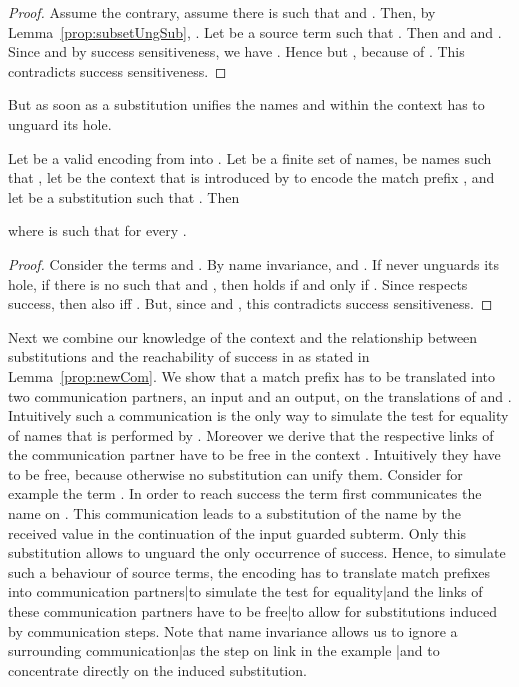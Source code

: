 \documentclass[]{article}
\begin{document}
\begin{proof}
	Assume the contrary, \ie assume there is  such that  and . Then, by Lemma~\ref{prop:subsetUngSub}, . Let  be a source term such that . Then  and  and . Since  and by success sensitiveness, we have . Hence  but , because of . This contradicts success sensitiveness.
\end{proof}

But as soon as a substitution unifies the names  and  within  the context has to unguard its hole.

\begin{lemma}
	\label{lem:subContextUnguardsHole}
	Let \encod be a valid encoding from \piT into \piNM.
	Let  be a finite set of names,
	 be names such that ,
	let  be the context that is introduced by  to encode the match prefix ,
	and let  be a substitution such that .
	Then
	
	where  is such that  for every .
\end{lemma}

\begin{proof}
	Consider the terms  and . By name invariance,  and . If  never unguards its hole, \ie if there is no  such that  and , then  holds if and only if . Since  respects success, then also  iff . But, since  and , this contradicts success sensitiveness.
\end{proof}

Next we combine our knowledge of the context  and the relationship between substitutions and the reachability of success in \piNM as stated in Lemma~\ref{prop:newCom}. We show that a match prefix  has to be translated into two communication partners, \ie an input and an output, on the translations of  and . Intuitively such a communication is the only way to simulate the test for equality of names that is performed by . Moreover we derive that the respective links of the communication partner have to be free in the context . Intuitively they have to be free, because otherwise no substitution can unify them. Consider for example the term . In order to reach success the term first communicates the name  on . This communication leads to a substitution of the name  by the received value  in the continuation of the input guarded subterm. Only this substitution allows to unguard the only occurrence of success. Hence, to simulate such a behaviour of source terms, the encoding has to translate match prefixes into communication {partners}|{to} simulate the test for {equality}|{and} the links of these communication partners have to be {free}|{to} allow for substitutions induced by communication steps. Note that name invariance allows us to ignore a surrounding {communication}|{as} the step on link  in the example |{and} to concentrate directly on the induced substitution.
\end{document}

